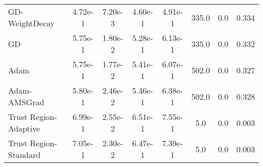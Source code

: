 \documentclass{article}
\begin{document}
\begin{table}[htbp]
{\begin{tabular}{l*{7}{S[table-format=2.2e-1]}}
GD-WeightDecay & 4.72e-1 & 7.20e-3 & 4.60e-1 & 4.91e-1 & 335.0 & 0.0 & 0.334 \\
GD & 5.75e-1 & 1.80e-2 & 5.28e-1 & 6.13e-1 & 335.0 & 0.0 & 0.332 \\
Adam & 5.75e-1 & 1.77e-2 & 5.41e-1 & 6.07e-1 & 502.0 & 0.0 & 0.327 \\
Adam-AMSGrad & 5.80e-1 & 2.46e-2 & 5.46e-1 & 6.38e-1 & 502.0 & 0.0 & 0.328 \\
Trust Region-Adaptive & 6.99e-1 & 2.55e-2 & 6.51e-1 & 7.55e-1 & 5.0 & 0.0 & 0.003 \\
Trust Region-Standard & 7.05e-1 & 2.30e-2 & 6.47e-1 & 7.39e-1 & 5.0 & 0.0 & 0.003 \\
\bottomrule
\end{tabular}
}
\end{table}
\end{document}
